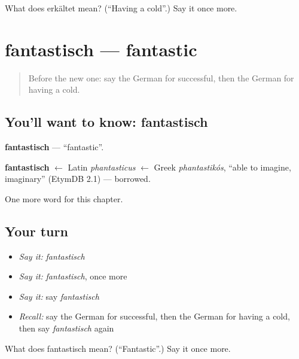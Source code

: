 \begin{tcolorbox}[breakable,colback=teal!4,colframe=teal!35!black,title={Before you move on}]
What does erkältet mean? (\textquotedblleft{}Having a cold\textquotedblright{}.) Say it once more.
\end{tcolorbox}
\section[fantastisch]{fantastisch — fantastic}

\label{lesson:GE-C213-fantastisch}



\begin{quote}
Before the new one: say the German for successful, then the German for having a cold.
\end{quote}

\subsection*{You'll want to know: fantastisch}
\textbf{fantastisch} — \textquotedblleft{}fantastic\textquotedblright{}.

\begin{cousinweb}
\textbf{fantastisch} $\leftarrow$ Latin \emph{phantasticus} $\leftarrow$ Greek \emph{phantastikós}, \textquotedblleft{}able to imagine, imaginary\textquotedblright{} (EtymDB 2.1) — borrowed.
\end{cousinweb}

\begin{grammarlens}[title={What you've built}]
One more word for this chapter.
\end{grammarlens}

\subsection*{Your turn}
\begin{itemize}
\raggedright
  \item \emph{Say it:} \emph{fantastisch}
  \item \emph{Say it:} \emph{fantastisch}, once more
  \item \emph{Say it:} say \emph{fantastisch}
  \item \emph{Recall:} say the German for successful, then the German for having a cold, then say \emph{fantastisch} again
\end{itemize}

\begin{tcolorbox}[breakable,colback=teal!4,colframe=teal!35!black,title={Before you move on}]
What does fantastisch mean? (\textquotedblleft{}Fantastic\textquotedblright{}.) Say it once more.
\end{tcolorbox}
